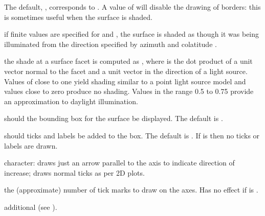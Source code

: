\begin{Arguments}
\begin{ldescription}
The default, , corresponds to .
A value of  will disable the drawing of borders: this is
sometimes useful when the surface is shaded.
\item[\code{ltheta, lphi}] if finite values are specified for 
and , the surface is shaded as though it was being
illuminated from the direction specified by azimuth 
and colatitude .
\item[\code{shade}] the shade at a surface facet is computed as
, where  is the dot product of
a unit vector normal to the facet and a unit vector in the
direction of a light source.  Values of  close
to one yield shading similar to a point light source model
and values close to zero produce no shading.  Values in the
range 0.5 to 0.75 provide an approximation to daylight
illumination.
\item[\code{box}] should the bounding box for the surface be displayed.
The default is .
\item[\code{axes}] should ticks and labels be added to the box.  The
default is .  If  is  then no
ticks or labels are drawn.
\item[\code{ticktype}] character:  draws just an arrow
parallel to the axis to indicate direction of increase;
 draws normal ticks as per 2D plots.
\item[\code{nticks}] the (approximate) number of tick marks to draw on the
axes.  Has no effect if  is .
\item[\code{...}] additional  (see ).
\end{ldescription}
\end{Arguments}
%
